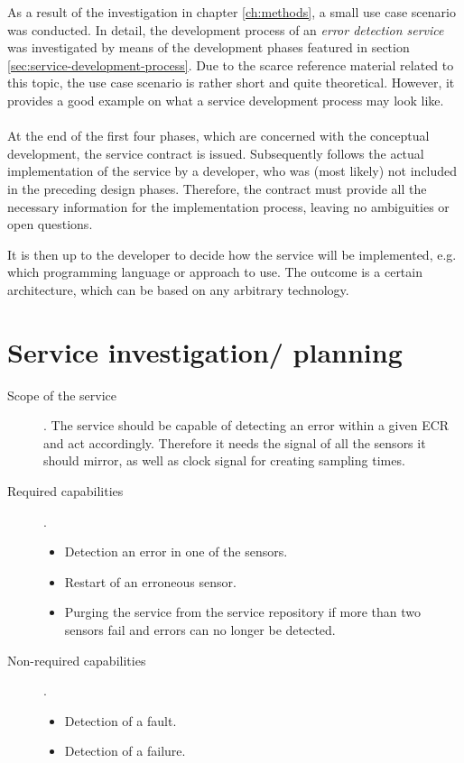 As a result of the investigation in chapter \ref{ch:methods}, a small use case scenario was conducted. In detail, the development process of an \emph{error detection service} was investigated by means of the development phases featured in section \ref{sec:service-development-process}. Due to the scarce reference material related to this topic, the use case scenario is rather short and quite theoretical. However, it provides a good example on what a service development process may look like.
\\
\\
At the end of the first four phases, which are concerned with the conceptual development, the service contract is issued. Subsequently follows the actual implementation of the service by a developer, who was (most likely) not included in the preceding design phases. Therefore, the contract must provide all the necessary information for the implementation process, leaving no ambiguities or open questions.

It is then up to the developer to decide how the service will be implemented, e.g. which programming language or approach to use. The outcome is a certain architecture, which can be based on any arbitrary technology. 



\section{Service investigation/ planning}


\begin{description}
\item [Scope of the service].
The service should be capable of detecting an error within a given ECR and act accordingly. Therefore it needs the signal of all the sensors it should mirror, as well as clock signal for creating sampling times.
\item [Required capabilities].
	\begin{itemize}
	\item Detection an error in one of the sensors.
	\item Restart of an erroneous sensor.
	\item Purging the service from the service repository if more than two sensors fail and errors can no longer be detected.
	\end{itemize}
\item [Non-required capabilities].
	\begin{itemize}
	\item Detection of a fault.
	\item Detection of a failure.
	\end{itemize}
\end{description}



